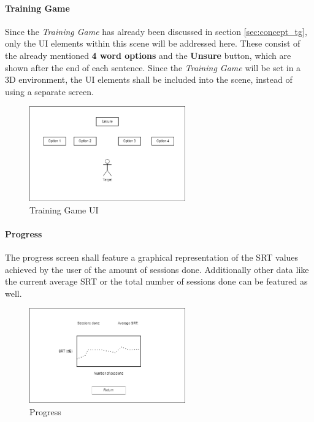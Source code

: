 \documentclass[a4paper,11pt]{article}%
\renewcommand{\\}{\vspace*{0.5\baselineskip} \newline}
\begin{document}
\paragraph{Training Game} Since the \textit{Training Game} has already been discussed in section \ref{sec:concept_tg}, only the \acs{UI} elements within this scene will be addressed here. These consist of the already mentioned \textbf{4 word options} and the \textbf{Unsure} button, which are shown after the end of each sentence. Since the \textit{Training Game} will be set in a 3D environment, the \acs{UI} elements shall be included into the scene, instead of using a separate screen.
\vspace{5mm}
\begin{figure}[h!]
\centering
\includegraphics[width=0.6\textwidth]{TrainingGame.png}
\caption{Training Game UI}
\label{fig:mainmenu}
\vspace{3mm}
\end{figure}
\newpage
\paragraph{Progress} The progress screen shall feature a graphical representation of the \ac{SRT} values achieved by the user of the amount of sessions done. Additionally other data like the current average \ac{SRT} or the total number of sessions done can be featured as well.
\begin{figure}[h!]
\centering
\includegraphics[width=0.6\textwidth]{Progress.png}
\caption{Progress}
\label{fig:progress}
\vspace{3mm}
\end{figure}
\end{document}
